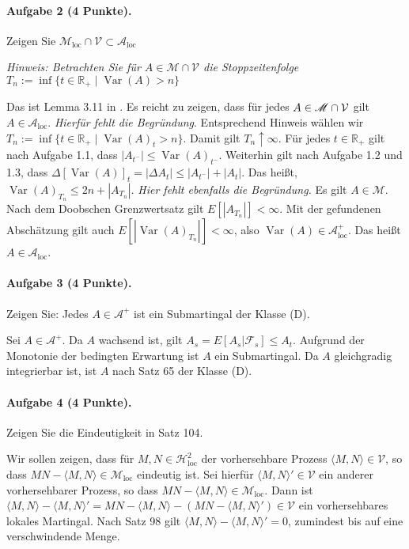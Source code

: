 \documentclass{article}
\begin{document}
\paragraph{Aufgabe 2 \textnormal{(4 Punkte)}.}
Zeigen Sie $\mathscr{M}_{\text{loc}}\cap\mathcal{V}\subset\mathscr{A}_{\text{loc}}$

\noindent\emph{Hinweis: Betrachten Sie für $A\in\mathscr{M}\cap\mathcal{V}$ die Stoppzeitenfolge $T_n:=\inf\{t\in\mathbb{R}_+\mid\operatorname{Var}(A)>n\}$}

Das ist Lemma 3.11 in \cite{jacod2013limit}.
Es reicht zu zeigen, dass für jedes $A\in\mathscr{M}\cap{\cal V}$ gilt $A\in\mathscr{A}_{\text{loc}}$.
\emph{Hierfür fehlt die Begründung}.
Entsprechend Hinweis wählen wir $T_n:=\inf\{t\in\mathbb{R}_+\mid\operatorname{Var}(A)_t>n\}$.
Damit gilt $T_n\uparrow\infty$.
Für jedes $t\in\mathbb{R}_+$ gilt nach Aufgabe 1.1, dass $|A_{t^-}|\leq\operatorname{Var}(A)_{t^-}$.
Weiterhin gilt nach Aufgabe 1.2 und 1.3, dass $\Delta[\operatorname{Var}(A)]_t=|\Delta A_t|\leq|A_{t^-}|+|A_t|$.
Das heißt, $\operatorname{Var}(A)_{T_n}\leq 2n+|A_{T_n}|$.
\emph{Hier fehlt ebenfalls die Begründung.}
Es gilt $A\in\mathscr{M}$.
Nach dem Doobschen Grenzwertsatz gilt $E[|A_{T_n}|]<\infty$.
Mit der gefundenen Abschätzung gilt auch $E[|\operatorname{Var}(A)_{T_n}|]<\infty$, also $\operatorname{Var}(A)\in\mathscr{A}_{\text{loc}}^+$.
Das heißt $A\in\mathscr{A}_{\text{loc}}$.

\paragraph{Aufgabe 3 \textnormal{(4 Punkte)}.}
Zeigen Sie: Jedes $A\in\mathscr{A}^+$ ist ein Submartingal der Klasse (D).

Sei $A\in\mathscr{A}^+$.
Da $A$ wachsend ist, gilt $A_s=E[A_s|\mathscr{F}_s]\leq A_t$.
Aufgrund der Monotonie der bedingten Erwartung ist $A$ ein Submartingal.
Da $A$ gleichgradig integrierbar ist, ist $A$ nach Satz 65 der Klasse (D).

\paragraph{Aufgabe 4 \textnormal{(4 Punkte)}.}
Zeigen Sie die Eindeutigkeit in Satz 104.

Wir sollen zeigen, dass für $M,N\in\mathscr{H}^2_{\text{loc}}$ der vorhersehbare Prozess $\langle M,N\rangle\in\mathscr{V}$, so dass $MN-\langle M,N\rangle\in\mathscr{M}_{\text{loc}}$ eindeutig ist.
Sei hierfür $\langle M,N\rangle'\in\mathscr{V}$ ein anderer vorhersehbarer Prozess, so dass $MN-\langle M,N\rangle\in\mathscr{M}_{\text{loc}}$.
Dann ist $\langle M,N\rangle-\langle M,N\rangle'=MN-\langle M,N\rangle-(MN-\langle M,N\rangle')\in\mathscr{V}$ ein vorhersehbares lokales Martingal.
Nach Satz 98 gilt $\langle M,N\rangle-\langle M,N\rangle'=0$, zumindest bis auf eine verschwindende Menge.

\end{document}

